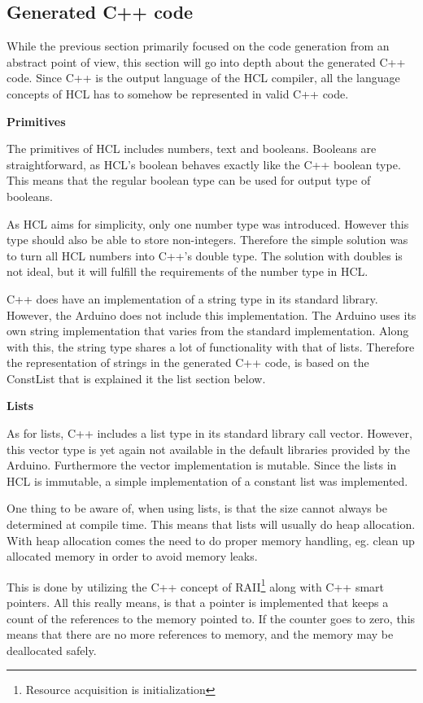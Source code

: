 
\subsection{Generated C++ code}

While the previous section primarily focused on the code generation from an abstract point of view, this section will go into depth about the generated C++ code.
Since C++ is the output language of the HCL compiler, all the language concepts of HCL has to somehow be represented in valid C++ code.

\textbf{Primitives}

The primitives of HCL includes numbers, text and booleans. 
Booleans are straightforward, as HCL's boolean behaves exactly like the C++ boolean type.
This means that the regular boolean type can be used for output type of booleans.

As HCL aims for simplicity, only one number type was introduced. 
However this type should also be able to store non-integers. 
Therefore the simple solution was to turn all HCL numbers into C++'s double type.
The solution with doubles is not ideal, but it will fulfill the requirements of the number type in HCL.

C++ does have an implementation of a string type in its standard library.
However, the Arduino does not include this implementation.
The Arduino uses its own string implementation that varies from the standard implementation.
Along with this, the string type shares a lot of functionality with that of lists.
Therefore the representation of strings in the generated C++ code, is based on the ConstList that is explained it the list section below.

\textbf{Lists}

As for lists, C++ includes a list type in its standard library call vector. 
However, this vector type is yet again not available in the default libraries provided by the Arduino.
Furthermore the vector implementation is mutable.
Since the lists in HCL is immutable, a simple implementation of a constant list was implemented.

One thing to be aware of, when using lists, is that the size cannot always be determined at compile time.
This means that lists will usually do heap allocation. 
With heap allocation comes the need to do proper memory handling, eg.
clean up allocated memory in order to avoid memory leaks.

This is done by utilizing the C++ concept of RAII\footnote{Resource acquisition is initialization} along with C++ smart pointers.
All this really means, is that a pointer is implemented that keeps a count of the references to the memory pointed to.
If the counter goes to zero, this means that there are no more references to memory, and the memory may be deallocated safely.

